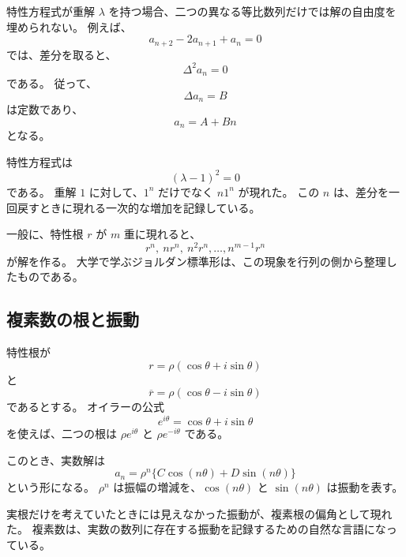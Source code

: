 特性方程式が重解 $\lambda$ を持つ場合、二つの異なる等比数列だけでは解の自由度を埋められない。
例えば、
\[
  a_{n+2}-2a_{n+1}+a_n=0
\]
では、差分を取ると、
\[
  \Delta^2a_n=0
\]
である。
従って、
\[
  \Delta a_n=B
\]
は定数であり、
\[
  a_n=A+Bn
\]
となる。

特性方程式は
\[
  (\lambda-1)^2=0
\]
である。
重解 $1$ に対して、$1^n$ だけでなく $n1^n$ が現れた。
この $n$ は、差分を一回戻すときに現れる一次的な増加を記録している。

一般に、特性根 $r$ が $m$ 重に現れると、
\[
  r^n,\ nr^n,\ n^2r^n,\ldots,n^{m-1}r^n
\]
が解を作る。
大学で学ぶジョルダン標準形は、この現象を行列の側から整理したものである。

\subsection{複素数の根と振動}

特性根が
\[
  r=\rho(\cos\theta+i\sin\theta)
\]
と
\[
  \overline r=\rho(\cos\theta-i\sin\theta)
\]
であるとする。
オイラーの公式
\[
  e^{i\theta}=\cos\theta+i\sin\theta
\]
を使えば、二つの根は $\rho e^{i\theta}$ と $\rho e^{-i\theta}$ である。

このとき、実数解は
\[
  a_n=\rho^n\{C\cos(n\theta)+D\sin(n\theta)\}
\]
という形になる。
$\rho^n$ は振幅の増減を、$\cos(n\theta)$ と $\sin(n\theta)$ は振動を表す。

実根だけを考えていたときには見えなかった振動が、複素根の偏角として現れた。
複素数は、実数の数列に存在する振動を記録するための自然な言語になっている。
